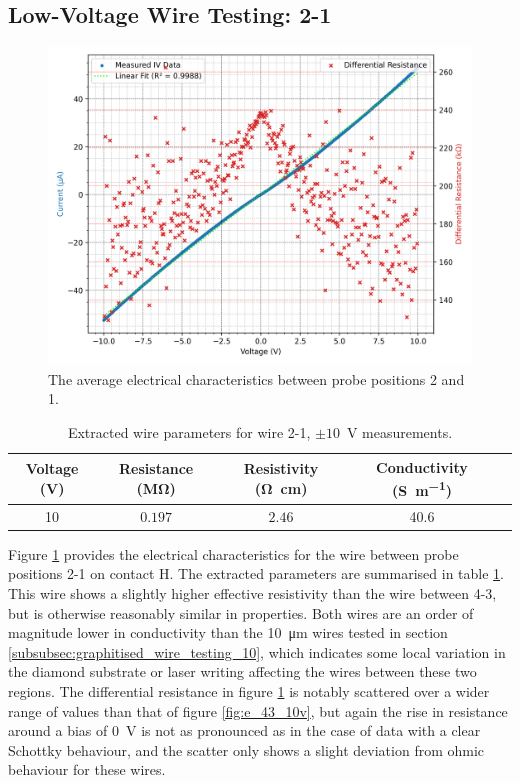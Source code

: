 \begin{refsection}
\subsection{Low-Voltage Wire Testing: 2-1}
\begin{figure}[H]
    \centering
    \includegraphics[width=\linewidth]{Chapter7/Figs/Raster/Emitters/21 3x 10V.png}
    \caption{The average electrical characteristics between probe positions 2 and 1.}
    \label{fig:e_21_10v}
\end{figure}

\begin{table}[h!]
\centering
\begin{tabular}{|c|c|c|c|c|}
\hline
\textbf{Voltage (V)} & \textbf{Resistance (\si{\mega\ohm})}  & \textbf{Resistivity (\si{\ohm\centi\metre})} & \textbf{Conductivity (\si{\siemens\per\metre})} \\
\hline
10 & $0.197$ & $2.46$ & 40.6 \\
\hline
\end{tabular}
\caption{Extracted wire parameters for wire 2-1, $\pm10$~\si{\volt} measurements.}
\label{tab:21_e_wire_parameters_10v}
\end{table}

Figure \ref{fig:e_21_10v} provides the electrical characteristics for the wire between probe positions 2-1 on contact H. The extracted parameters are summarised in table \ref{tab:21_e_wire_parameters_10v}. This wire shows a slightly higher effective resistivity than the wire between 4-3, but is otherwise reasonably similar in properties. Both wires are an order of magnitude lower in conductivity than the 10~\si{\micro\metre} wires tested in section \ref{subsubsec:graphitised_wire_testing_10}, which indicates some local variation in the diamond substrate or laser writing affecting the wires between these two regions. The differential resistance in figure \ref{fig:e_21_10v} is notably scattered over a wider range of values than that of figure \ref{fig:e_43_10v}, but again the rise in resistance around a bias of 0~\si{\volt} is not as pronounced as in the case of data with a clear Schottky behaviour, and the scatter only shows a slight deviation from ohmic behaviour for these wires.


\end{refsection}
